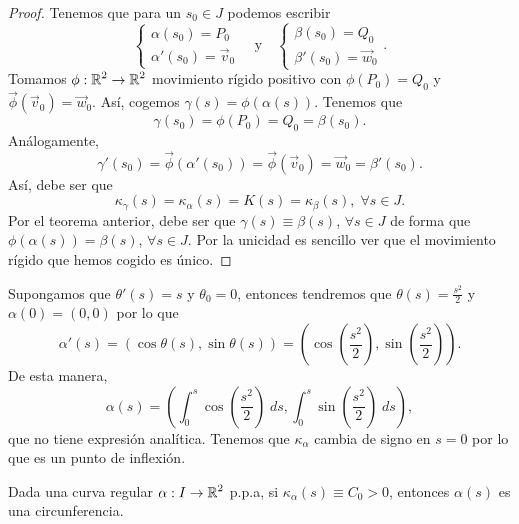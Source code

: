 \begin{proof}
Tenemos que para un $\displaystyle s_{0} \in J $ podemos escribir 
	\[
	\begin{cases}
	\alpha\left(s_{0}\right)=P_{0} \\
	\alpha'\left(s_{0}\right)=\vec{v}_{0}
	\end{cases}
	\quad \text{y} \quad
\begin{cases}
\beta\left(s_{0}\right)=Q_{0} \\
\beta'\left(s_{0}\right)=\vec{w}_{0}
\end{cases}
.\]
Tomamos $\displaystyle \phi: \mathbb{R}^{2}\to \mathbb{R}^{2} $ movimiento rígido positivo con $\displaystyle \phi\left(P_{0}\right)=Q_{0} $ y $\displaystyle \vec{\phi}\left(\vec{v}_{0}\right)=\vec{w}_{0} $. Así, cogemos $\displaystyle \gamma\left(s\right)=\phi\left(\alpha\left(s\right)\right) $. Tenemos que 
\[\gamma\left(s_{0}\right)=\phi\left(P_{0}\right)=Q_{0}=\beta\left(s_{0}\right) .\]
Análogamente, 
\[\gamma'\left(s_{0}\right)=\vec{\phi}\left(\alpha'\left(s_{0}\right)\right)=\vec{\phi}\left(\vec{v}_{0}\right)=\vec{w}_{0}=\beta'\left(s_{0}\right) .\]
Así, debe ser que 
\[\kappa_{\gamma }\left(s\right)=\kappa_{\alpha}\left(s\right)=K\left(s\right)=\kappa_{\beta}\left(s\right), \; \forall s \in J.\]
Por el teorema anterior, debe ser que $\displaystyle \gamma\left(s\right)\equiv \beta\left(s\right) $, $\displaystyle \forall s \in J $ de forma que $\displaystyle \phi\left(\alpha\left(s\right)\right)=\beta\left(s\right) $, $\displaystyle \forall s \in J $. Por la unicidad es sencillo ver que el movimiento rígido que hemos cogido es único.
\end{proof}

\begin{eg}
Supongamos que $\displaystyle \theta'\left(s\right)=s $ y $\displaystyle \theta_{0}=0 $, entonces tendremos que $\displaystyle \theta\left(s\right)=\frac{s^{2}}{2} $ y $\displaystyle \alpha\left(0\right)=\left(0,0\right) $ por lo que 
\[\alpha'\left(s\right)=\left(\cos\theta\left(s\right), \sin\theta\left(s\right)\right)=\left(\cos\left(\frac{s^{2}}{2}\right), \sin\left(\frac{s^{2}}{2}\right)\right) .\]
De esta manera, 
\[\alpha\left(s\right)=\left(\int^{s}_{0} \cos\left(\frac{s^{2}}{2}\right) \; d s, \int^{s}_{0} \sin\left(\frac{s^{2}}{2}\right) \; d s\right) ,\]
que no tiene expresión analítica. Tenemos que $\displaystyle \kappa_{\alpha } $ cambia de signo en $\displaystyle s = 0 $ por lo que es un punto de inflexión. 
\end{eg}

\begin{prop}
Dada una curva regular $\displaystyle \alpha: I \to \mathbb{R}^{2} $ p.p.a, si $\displaystyle \kappa_{\alpha }\left(s\right)\equiv C_{0}>0 $, entonces $\displaystyle \alpha\left(s\right) $ es una circunferencia.
\end{prop}

